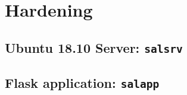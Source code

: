 \section{Hardening}

\pagebreak
\subsection{Ubuntu 18.10 Server: \texttt{salsrv}}

\pagebreak
\subsection{Flask application: \texttt{salapp}}
